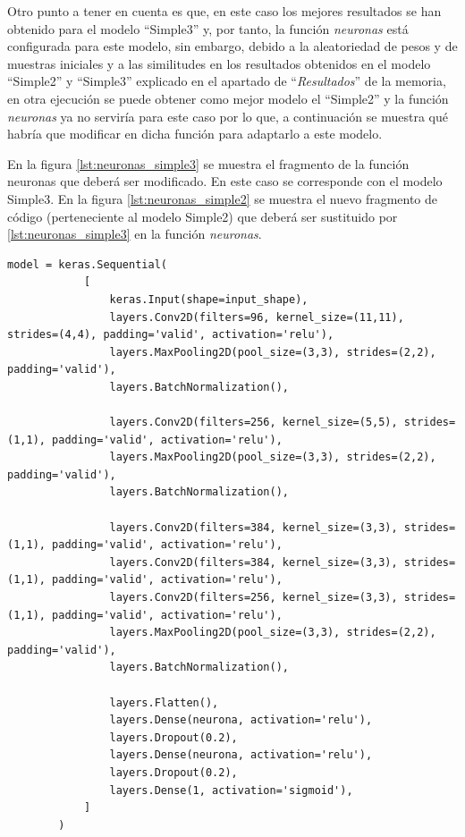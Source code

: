Otro punto a tener en cuenta es que, en este caso los mejores resultados se han obtenido para el modelo ``Simple3'' y, por tanto, la función \textit{neuronas} está configurada para este modelo, sin embargo, debido a la aleatoriedad de pesos y de muestras iniciales y a las similitudes en los resultados obtenidos en el modelo ``Simple2'' y ``Simple3'' explicado en el apartado de ``\textit{Resultados}'' de la memoria, en otra ejecución se puede obtener como mejor modelo el ``Simple2'' y la función \textit{neuronas} ya no serviría para este caso por lo que, a continuación se muestra qué habría que modificar en dicha función para adaptarlo a este modelo.

En la figura \ref{lst:neuronas_simple3} se muestra el fragmento de la función neuronas que deberá ser modificado. En este caso se corresponde con el modelo Simple3. En la figura \ref{lst:neuronas_simple2} se muestra el nuevo fragmento de código (perteneciente al modelo Simple2) que deberá ser sustituido por \ref{lst:neuronas_simple3} en la función \textit{neuronas}.

\begin{lstlisting}[caption={Segmento de la función neuronas correspondiente al modelo Simple3}, label={lst:neuronas_simple3}]
model = keras.Sequential(
            [
                keras.Input(shape=input_shape),
                layers.Conv2D(filters=96, kernel_size=(11,11), strides=(4,4), padding='valid', activation='relu'),
                layers.MaxPooling2D(pool_size=(3,3), strides=(2,2), padding='valid'),
                layers.BatchNormalization(),
                
                layers.Conv2D(filters=256, kernel_size=(5,5), strides=(1,1), padding='valid', activation='relu'),
                layers.MaxPooling2D(pool_size=(3,3), strides=(2,2), padding='valid'),
                layers.BatchNormalization(),
                
                layers.Conv2D(filters=384, kernel_size=(3,3), strides=(1,1), padding='valid', activation='relu'),
                layers.Conv2D(filters=384, kernel_size=(3,3), strides=(1,1), padding='valid', activation='relu'),
                layers.Conv2D(filters=256, kernel_size=(3,3), strides=(1,1), padding='valid', activation='relu'),
                layers.MaxPooling2D(pool_size=(3,3), strides=(2,2), padding='valid'),
                layers.BatchNormalization(),
                
                layers.Flatten(), 
                layers.Dense(neurona, activation='relu'), 
                layers.Dropout(0.2),
                layers.Dense(neurona, activation='relu'), 
                layers.Dropout(0.2),
                layers.Dense(1, activation='sigmoid'), 
            ]
        )
\end{lstlisting}


